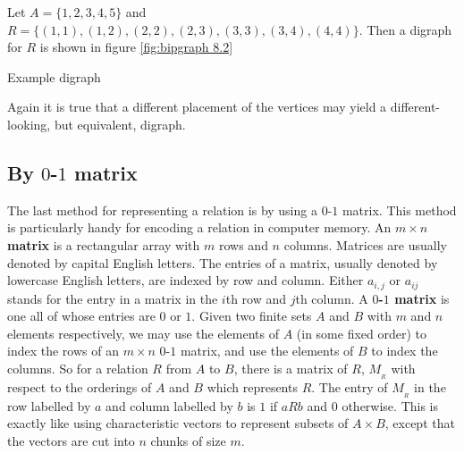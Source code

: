 \begin{exmp}
 Let $A=\{1,2,3,4,5\}$ and \\
 $R=\{(1,1),(1,2),(2,2),(2,3),(3,3),(3,4),(4,4)\}$.
Then a digraph for $R$ is shown in figure \ref{fig:bipgraph 8.2}
\begin{marginfigure}

\caption{Example digraph}\label{fig:bipgraph 8.2}
\end{marginfigure}
\end{exmp}

Again it is true that a different placement of the vertices may yield a different-looking, but equivalent, digraph.


\subsection{By $0$-$1$ matrix}
The last method for representing a relation is by using a $0${-}$1$ matrix. This method is particularly
handy for encoding a relation in computer memory.
An {\bfseries $m\times n$ matrix} is a rectangular array with $m$ rows and $n$ columns.
Matrices are usually denoted by capital English letters. The entries of a matrix, usually
denoted by lowercase English letters, are indexed by row and column. Either $a_{i,j}$ or $a_{ij}$
stands for the entry in a matrix in the $i$th row and $j$th column. 
A {\bfseries $0$-$1$ matrix} is one all of whose entries are $0$ or $1$. Given two 
finite sets $A$ and $B$ with 
$m$ and $n$ elements respectively, we may use the elements of $A$ (in some fixed order) to index the rows of an
$m\times n$ $0$-$1$ matrix, and use the elements of $B$ to index the columns. So for a relation $R$
from $A$ to $B$, there is a matrix of $R$, $M_{_R}$ with respect to the orderings of $A$ and $B$ which
represents $R$. The entry of $M_{_R}$ in the row labelled by $a$ and column labelled by $b$
is $1$ if $aRb$ and $0$ otherwise. This is exactly like using characteristic vectors to represent
subsets of $A\times B$, except that the  vectors are cut into $n$ chunks of size
$m$.


